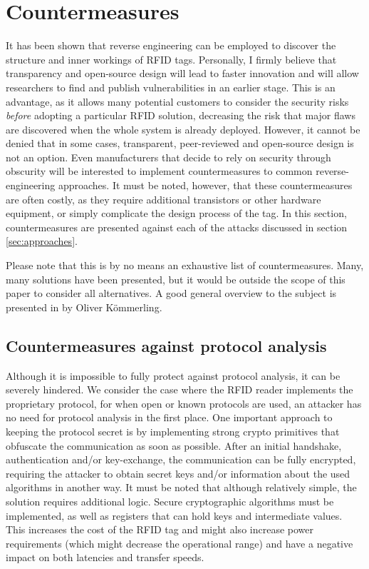 \documentclass{llncs}
\begin{document}
\section{Countermeasures}
\label{sec:countermeasures}
It has been shown that reverse engineering can be employed to discover the structure and inner workings of RFID tags. Personally, I firmly believe that transparency and open-source design will lead to faster innovation and will allow researchers to find and publish vulnerabilities in an earlier stage. This is an advantage, as it allows many potential customers to consider the security risks \emph{before} adopting a particular RFID solution, decreasing the risk that major flaws are discovered when the whole system is already deployed. However, it cannot be denied that in some cases, transparent, peer-reviewed and open-source design is not an option. Even manufacturers that decide to rely on security through obscurity will be interested to implement countermeasures to common reverse-engineering approaches. It must be noted, however, that these countermeasures are often costly, as they require additional transistors or other hardware equipment, or simply complicate the design process of the tag. In this section, countermeasures are presented against each of the attacks discussed in section \ref{sec:approaches}. 

Please note that this is by no means an exhaustive list of countermeasures. Many, many solutions have been presented, but it would be outside the scope of this paper to consider all alternatives. A good general overview to the subject is presented in \cite{doc:kommerling} by Oliver Kömmerling.


\subsection{Countermeasures against protocol analysis}
Although it is impossible to fully protect against protocol analysis, it can be severely hindered. We consider the case where the RFID reader implements the proprietary protocol, for when open or known protocols are used, an attacker has no need for protocol analysis in the first place. One important approach to keeping the protocol secret is by implementing strong crypto primitives that obfuscate the communication as soon as possible. After an initial handshake, authentication and/or key-exchange, the communication can be fully encrypted, requiring the attacker to obtain secret keys and/or information about the used algorithms in another way. It must be noted that although relatively simple, the solution requires additional logic. Secure cryptographic algorithms must be implemented, as well as registers that can hold keys and intermediate values. This increases the cost of the RFID tag and might also increase power requirements (which might decrease the operational range) and have a negative impact on both latencies and transfer speeds. 
\end{document}
